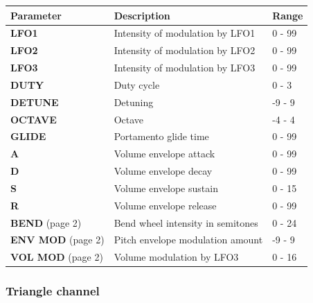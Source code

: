\documentclass[a4paper, 12p, titlepaget]{book}
\begin{document}
\begin{tabular}{l | l | l}
Parameter & Description & Range\\ \hline
\textbf{LFO1} & Intensity of modulation by LFO1 & 0 - 99\\
\textbf{LFO2} & Intensity of modulation by LFO2 & 0 - 99\\
\textbf{LFO3} & Intensity of modulation by LFO3 & 0 - 99\\
\textbf{DUTY} & Duty cycle & 0 - 3\\
\textbf{DETUNE} & Detuning & -9 - 9\\
\textbf{OCTAVE} & Octave & -4 - 4\\
\textbf{GLIDE} & Portamento glide time & 0 - 99\\
\textbf{A} & Volume envelope attack & 0 - 99\\
\textbf{D} & Volume envelope decay & 0 - 99\\
\textbf{S} & Volume envelope sustain & 0 - 15\\
\textbf{R} & Volume envelope release & 0 - 99\\
\textbf{BEND} (page 2) & Bend wheel intensity in semitones & 0 - 24\\
\textbf{ENV MOD} (page 2) & Pitch envelope modulation amount & -9 - 9\\
\textbf{VOL MOD} (page 2) & Volume modulation by LFO3 & 0 - 16\\
\end{tabular}

\subsubsection{Triangle channel}

\end{document}
